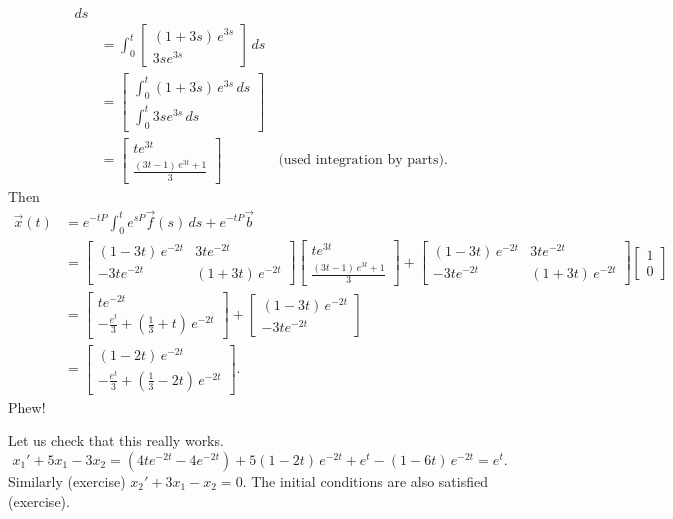 \begin{example}
\begin{equation*}
\begin{split}
\, ds
\\
& =
\int_0^t
 \begin{bmatrix}
 (1+3s)\,e^{3s} \\
 3se^{3s}
 \end{bmatrix}
\, ds
\\
 &=
 \begin{bmatrix}
 \int_0^t (1+3s)\,e^{3s} \,ds \\
 \int_0^t 3se^{3s} \,ds
 \end{bmatrix}
\\
& =
\begin{bmatrix}
t e^{3t} \\
\frac{(3t-1) \,e^{3t} + 1}{3}
\end{bmatrix} %
\qquad \qquad \text{(used integration by parts).}
\end{split}
\end{equation*}
Then
\begin{equation*}
\begin{split}
\vec{x}(t)
& = e^{-tP} \int_0^t e^{sP}\vec{f}(s) \, ds + e^{-tP} \vec{b} \\
& =
\begin{bmatrix}
(1-3t)\,e^{-2t} & 3te^{-2t} \\
-3te^{-2t} & (1+3t)\,e^{-2t}
\end{bmatrix}
\begin{bmatrix}
t e^{3t} \\
\frac{(3t-1) \,e^{3t} + 1}{3}
\end{bmatrix}
+
\begin{bmatrix}
(1-3t)\,e^{-2t} & 3te^{-2t} \\
-3te^{-2t} & (1+3t)\,e^{-2t}
\end{bmatrix}
\begin{bmatrix} 1 \\ 0 \end{bmatrix} \\
& =
\begin{bmatrix}
te^{-2t} \\
-\frac{e^t}{3}+\left( \frac{1}{3} + t \right) \, e^{-2t}
\end{bmatrix}
+
\begin{bmatrix}
(1-3t)\,e^{-2t} \\
-3te^{-2t}
\end{bmatrix} \\
& =
\begin{bmatrix}
(1-2t)\,e^{-2t} \\
-\frac{e^t}{3}+\left( \frac{1}{3} -2 t \right) \, e^{-2t}
\end{bmatrix} .
\end{split}
\end{equation*}
Phew!

Let us check that this really works.
\begin{equation*}
x_1' + 5 x_1 - 3x_2 = (4te^{-2t} - 4 e^{-2t}) + 5
(1-2t)\,e^{-2t} 
+e^t-( 1 -6 t ) \, e^{-2t} = e^t .
\end{equation*}
Similarly (exercise) $x_2' + 3 x_1 - x_2 = 0$.   The initial conditions are
also satisfied (exercise).
\end{example}

